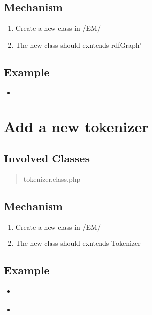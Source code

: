 \documentclass[letterpaper,10pt,english]{sphinxmanual}
\begin{document}
\subsection{Mechanism}
\label{docs/hooks/t_rdf_parser:mechanism}\begin{enumerate}
\item {} 
Create a new class in /EM/

\item {} 
The new class should exntends rdfGraph'

\end{enumerate}


\subsection{Example}
\label{docs/hooks/t_rdf_parser:example}\begin{itemize}
\item {} 
{\hyperref[docs/api:EasyRdfAdapter]{}}

\end{itemize}


\section{Add a new tokenizer}
\label{docs/hooks/t_tokenizer::doc}\label{docs/hooks/t_tokenizer:hook-template-uss}\label{docs/hooks/t_tokenizer:add-a-new-tokenizer}

\subsection{Involved Classes}
\label{docs/hooks/t_tokenizer:involved-classes}\begin{quote}

tokenizer.class.php
\end{quote}


\subsection{Mechanism}
\label{docs/hooks/t_tokenizer:mechanism}\begin{enumerate}
\item {} 
Create a new class in /EM/

\item {} 
The new class should exntends Tokenizer

\end{enumerate}


\subsection{Example}
\label{docs/hooks/t_tokenizer:example}\begin{itemize}
\item {} 
{\hyperref[docs/api:CaseBasedTokenizer]{}}

\item {} 
{\hyperref[docs/api:DelimitBasedTokenizer]{}}

\end{itemize}
\end{document}
